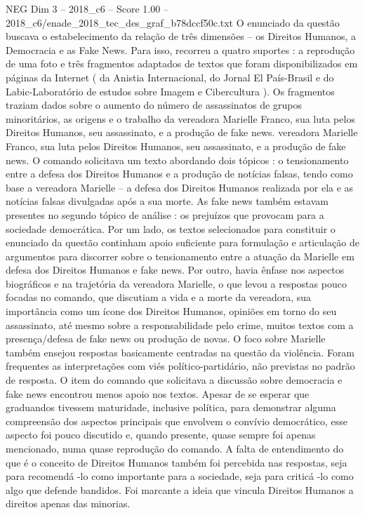 \begin{textsample}{NEG Dim 3 – 2018\_c6 – Score 1.00 – 2018\_c6/enade\_2018\_tec\_des\_graf\_b78dccf50c.txt}
O enunciado da questão buscava o estabelecimento da relação de três dimensões – os Direitos Humanos, a Democracia e as Fake News.
Para isso, recorreu a quatro suportes : a reprodução de uma foto e três fragmentos adaptados de textos que foram disponibilizados em páginas da Internet ( da Anistia Internacional, do Jornal El País-Brasil e do Labic-Laboratório de estudos sobre Imagem e Cibercultura ).
Os fragmentos traziam dados sobre o aumento do número de assassinatos de grupos minoritários, as origens e o trabalho da vereadora Marielle Franco, sua luta pelos Direitos Humanos, seu assassinato, e a produção de fake news. vereadora Marielle Franco, sua luta pelos Direitos Humanos, seu assassinato, e a produção de fake news.
O comando solicitava um texto abordando dois tópicos : o tensionamento entre a defesa dos Direitos Humanos e a produção de notícias falsas, tendo como base a vereadora Marielle – a defesa dos Direitos Humanos realizada por ela e as notícias falsas divulgadas após a sua morte.
As fake news também estavam presentes no segundo tópico de análise : os prejuízos que provocam para a sociedade democrática.
Por um lado, os textos selecionados para constituir o enunciado da questão continham apoio suficiente para formulação e articulação de argumentos para discorrer sobre o tensionamento entre a atuação da Marielle em defesa dos Direitos Humanos e fake news.
Por outro, havia ênfase nos aspectos biográficos e na trajetória da vereadora Marielle, o que levou a respostas pouco focadas no comando, que discutiam a vida e a morte da vereadora, sua importância como um ícone dos Direitos Humanos, opiniões em torno do seu assassinato, até mesmo sobre a responsabilidade pelo crime, muitos textos com a presença/defesa de fake news ou produção de novas.
O foco sobre Marielle também ensejou respostas basicamente centradas na questão da violência.
Foram frequentes as interpretações com viés político-partidário, não previstas no padrão de resposta.
O item do comando que solicitava a discussão sobre democracia e fake news encontrou menos apoio nos textos.
Apesar de se esperar que graduandos tivessem maturidade, inclusive política, para demonstrar alguma compreensão dos aspectos principais que envolvem o convívio democrático, esse aspecto foi pouco discutido e, quando presente, quase sempre foi apenas mencionado, numa quase reprodução do comando.
A falta de entendimento do que é o conceito de Direitos Humanos também foi percebida nas respostas, seja para recomendá -lo como importante para a sociedade, seja para criticá -lo como algo que defende bandidos.
Foi marcante a ideia que vincula Direitos Humanos a direitos apenas das minorias.

\end{textsample}
